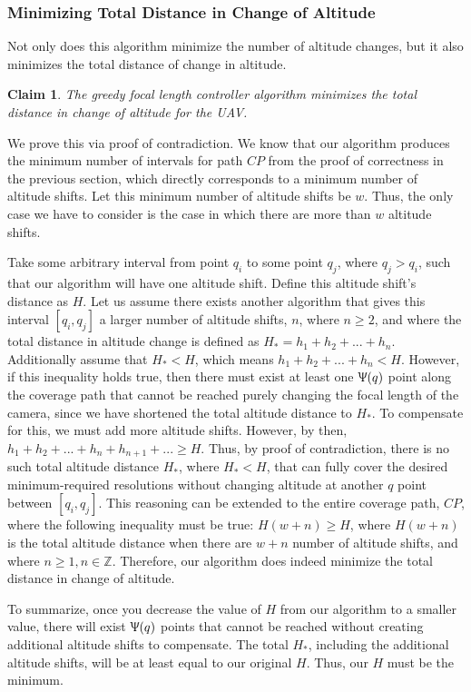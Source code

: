 \documentclass[conference]{IEEEtran}
\theoremstyle{plain}%
\newtheorem{claim}[theorem]{Claim}
\begin{document}
\subsubsection{Minimizing Total Distance in Change of Altitude}
Not only does this algorithm minimize the number of altitude changes, but it also minimizes the total distance of change in altitude.
\begin{claim} %
The greedy focal length controller algorithm minimizes the total distance in change of altitude for the UAV.
\end{claim}
We prove this via proof of contradiction. We know that our algorithm produces the minimum number of intervals for path $CP$ from the proof of correctness in the previous section, which directly corresponds to a minimum number of altitude shifts. Let this minimum number of altitude shifts be $w$. Thus, the only case we have to consider is the case in which there are more than $w$ altitude shifts.

Take some arbitrary interval from point $q_i$ to some point $q_j$, where $q_j > q_i$, such that our algorithm will have one altitude shift. Define this altitude shift's distance as $H$. Let us assume there exists another algorithm that gives this interval $[q_i, q_j]$ a larger number of altitude shifts, $n$, where $n \geq 2$, and where the total distance in altitude change is defined as $H_* = h_1 + h_2 + ... + h_n$. Additionally assume that $H_* < H$, which means $h_1 + h_2 + ... + h_n < H$. However, if this inequality holds true, then there must exist at least one $\Uppsi(q)$ point along the coverage path that cannot be reached purely changing the focal length of the camera, since we have shortened the total altitude distance to $H_*$. To compensate for this, we must add more altitude shifts. However, by then, $h_1 + h_2 + ... + h_n + h_{n+1} + ... \geq H$. Thus, by proof of contradiction, there is no such total altitude distance $H_*$, where $H_* < H$, that can fully cover the desired minimum-required resolutions without changing altitude at another $q$ point between $[q_i, q_j]$. This reasoning can be extended to the entire coverage path, $CP$, where the following inequality must be true: $H(w+n) \geq H$, where $H(w+n)$ is the total altitude distance when there are $w+n$ number of altitude shifts, and where $n \geq 1, n \in \mathds{Z}$. Therefore, our algorithm does indeed minimize the total distance in change of altitude.

To summarize, once you decrease the value of $H$ from our algorithm to a smaller value, there will exist $\Uppsi(q)$ points that cannot be reached without creating additional altitude shifts to compensate. The total $H_*$, including the additional altitude shifts, will be at least equal to our original $H$. Thus, our $H$ must be the minimum.
\end{document}
